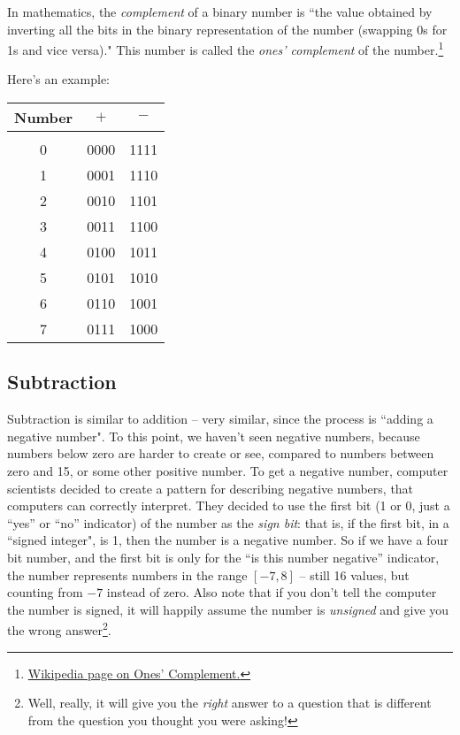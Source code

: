 In mathematics, the \emph{complement} of a binary number is ``the value obtained by inverting all the bits in the binary representation of the number (swapping 0s for 1s and vice versa)." This number is called the \emph{ones' complement} of the number.\footnote{{\color{webblue}\href{https://en.wikipedia.org/wiki/Ones\%27_complement}{Wikipedia page on Ones' Complement.}}}


Here's an example:

\bigskip

\begin{tabular} {c c c}
 Number &  $+$   &   $-$ \\[\sep]
 \hline\\[\negsep]
 0  &  0000 &  1111  \\ 
 1  & 0001  & 1110  \\
 2  & 0010  & 1101\\
 3  & 0011  & 1100\\
 4  & 0100  & 1011\\
 5  & 0101  & 1010\\
 6  & 0110  & 1001\\
 7  & 0111  & 1000\\
 \hline

\end{tabular}

\subsection*{Subtraction}

Subtraction is similar to addition -- very similar, since the process is ``adding a negative number". To this point, we haven't seen negative numbers, because numbers below zero are harder to create or see, compared to numbers between zero and 15, or some other positive number. To get a negative number, computer scientists decided to create a pattern for describing negative numbers, that computers can correctly interpret. They decided to use the first bit (1 or 0, just a ``yes'' or ``no'' indicator) of the number as the \emph{sign bit}: that is, if the first bit, in a ``signed integer", is 1, then the number is a negative number. So if we have a four bit number, and the first bit is only for the ``is this number negative'' indicator, the number represents numbers in the range $[-7,8]$ -- still 16 values, but counting from $-7$ instead of zero. Also note that if you don't tell the computer the number is signed, it will happily assume the number is \emph{unsigned} and give you the wrong answer\footnote{Well, really, it will give you the \emph{right} answer to a question that is different from the question you thought you were asking!}.

